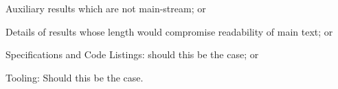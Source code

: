 \documentclass[
  oneside,
  11pt, a4paper,
  footinclude=true,
  headinclude=true,
  cleardoublepage=empty
]{scrbook}
\begin{document}
	

	Auxiliary results which are not main-stream; or

	Details of results whose length would compromise readability of main text; or

	Specifications and Code Listings: should this be the case; or

	Tooling: Should this be the case.



\end{document}

